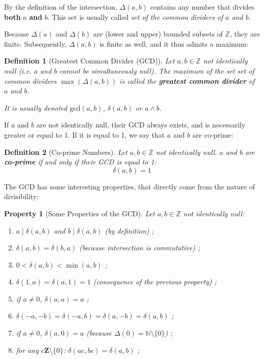 \documentclass{article}
\newtheorem{definition}{Definition}
\newtheorem{property}{Property}
\newcommand{\divi}{\mathbin{\mid}}
\begin{document}
By the definition of the intersection, $\Delta(a,b)$ contains any number that divides \textbf{both} $a$ \textbf{and} $b$. This set is usually called \textit{set of the common dividers of $a$ and $b$}.

Because $\Delta(a)$ and $\Delta(b)$ are (lower and upper) bounded subsets of $\mathbb{Z}$, they are finite. Subsequently, $\Delta(a,b)$ is finite as well, and it thus admits a maximum:

\begin{definition}[Greatest Common Divider (GCD)]
Let $a, b \in \mathbb{Z}$ not identically null (i.e. $a$ and $b$ cannot be simultaneously null). The maximum of the set set of common dividers $\max(\Delta(a,b))$ is called the \textbf{greatest common divider} of $a$ and $b$.

It is usually denoted $\mathrm{gcd}(a,b)$, $\delta(a,b)$ or $a \wedge b$.
\end{definition}

If $a$ and $b$ are not identically null, their GCD always exists, and is necessarily greater or equal to 1. If it is equal to 1, we say that $a$ and $b$ are co-prime:

\begin{definition}[Co-prime Numbers]
Let $a,b \in \mathbb{Z}$ not identically null. $a$ and $b$ are \textbf{co-prime} if and only if their GCD is equal to 1:
$$\delta(a,b) = 1$$
\end{definition}

The GCD has some interesting properties, that directly come from the nature of divisibility:

\begin{property}[Some Properties of the GCD]
Let $a,b \in \mathbb{Z}$ not identically null:
\begin{enumerate}
\item $a \divi \delta(a,b)$ and $b \divi \delta(a,b)$ (by definition) ;
\item $\delta(a,b) = \delta(b,a)$ (because intersection is commutative) ;
\item $0 < \delta(a,b) < \min(a,b)$ ;
\item $\delta(1,a) = \delta(a,1) = 1$ (consequence of the previous property) ;
\item if $a \neq 0$, $\delta(a,a) = a$ ;
\item $\delta(-a,-b) = \delta(-a,b) = \delta(a,-b) = \delta(a,b)$ ;
\item if $a \neq 0$, $\delta(a,0) = a$ (because $\Delta(0) = \mathbb{N} \setminus \{ 0 \}$) ;
\item for any $c \mathbf{Z} \setminus \{ 0 \}$: $\delta(a c, b c) = \delta(a,b)$ ;
\end{enumerate}
\end{property}
\end{document}
